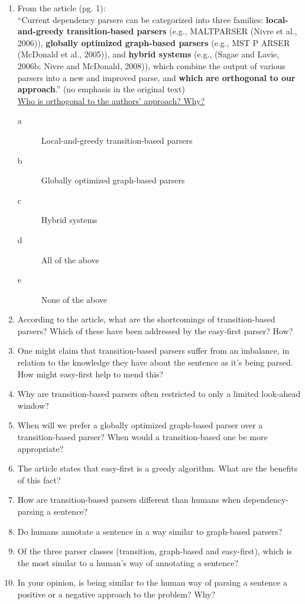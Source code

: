 \documentclass[11pt]{article}
\begin{document}
\begin{enumerate}
\item From the article (pg. 1): \\
``Current dependency parsers can be categorized
     into three families: \textbf{local-and-greedy transition-based parsers}
     (e.g., MALTPARSER (Nivre et al., 
     2006)), \textbf{globally optimized graph-based parsers}
     (e.g., MST P ARSER (McDonald et al., 2005)), and
     \textbf{hybrid systems} (e.g., (Sagae and Lavie, 2006b;
     Nivre and McDonald, 2008)), which combine the
     output of various parsers into a new and improved
     parse, and \textbf{which are orthogonal to our approach}.''  (no emphasis   
   in the original text) \\
   \underline{Who is orthogonal to the authors' approach? Why?} \\
\begin{description}
\item[a] Local-and-greedy transition-based parsers
\item[b] Globally optimized graph-based parsers
\item[c] Hybrid systems
\item[d] All of the above
\item[e] None of the above
\end{description}
\item According to the article, what are the shortcomings of
   transition-based parsers? Which of these have been addressed by the
   easy-first parser? How?
\item One might claim that transition-based parsers suffer from an
   imbalance, in relation to the knowledge they have about the
   sentence as it's being parsed. How might easy-first help to mend
   this?
\item Why are transition-based parsers often restricted to only a limited
   look-ahead window?
\item When will we prefer a globally optimized graph-based parser over a
   transition-based parser? When would a transition-based one be more
   appropriate?
\item The article states that easy-first is a greedy algorithm. What are
   the benefits of this fact?
\item How are transition-based parsers different than humans when
   dependency-parsing a sentence?
\item Do humans annotate a sentence in a way similar to graph-based
   parsers?
\item Of the three parser classes (transition, graph-based and
   easy-first), which is the most similar to a human's way of
   annotating a sentence?
\item In your opinion, is being similar to the human way of parsing a
    sentence a positive or a negative approach to the problem? Why?
\end{enumerate}
\end{document}
